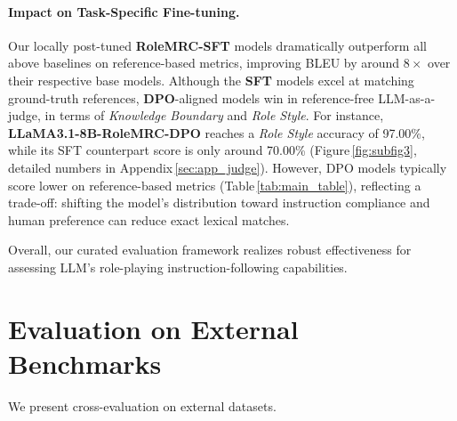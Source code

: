 \paragraph{Impact on Task-Specific Fine-tuning.} Our locally post-tuned \textbf{RoleMRC-SFT} models dramatically outperform all above baselines on reference-based metrics, improving BLEU by around $8\times$ over their respective base models. Although the \textbf{SFT} models excel at matching ground-truth references, \textbf{DPO}-aligned models win in reference-free LLM-as-a-judge, in terms of \emph{Knowledge Boundary} and \emph{Role Style}. For instance, \textbf{LLaMA3.1-8B-RoleMRC-DPO} reaches a \emph{Role Style} accuracy of 97.00\%, while its SFT counterpart score is only around 70.00\% (Figure\,\ref{fig:subfig3}, detailed numbers in Appendix\,\ref{sec:app_judge}). However, DPO models typically score lower on reference-based metrics (Table\,\ref{tab:main_table}), reflecting a trade-off: shifting the model's distribution toward instruction compliance and human preference can reduce exact lexical matches.

Overall, our curated evaluation framework realizes robust effectiveness for assessing LLM's role-playing instruction-following capabilities.

\section{Evaluation on External Benchmarks}
We present cross-evaluation on external datasets.

